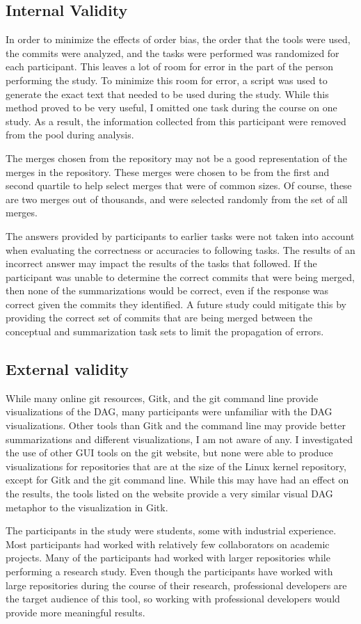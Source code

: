 \subsection{Internal Validity}\label{sub:internal_validity}

In order to minimize the effects of order bias, the order that the tools
were used, the commits were analyzed, and the tasks were performed was
randomized for each participant. This leaves a lot of room for error in
the part of the person performing the study. To minimize this room for
error, a script was used to generate the exact text that needed to be
used during the study. While this method proved to be very useful, I
omitted one task during the course on one study. As a result, the
information collected from this participant were removed from the pool
during analysis.

The merges chosen from the repository may not be a good representation
of the merges in the repository. These merges were chosen to be from the
first and second quartile to help select merges that were of common
sizes. Of course, these are two merges out of thousands, and were
selected randomly from the set of all merges.

The answers provided by participants to earlier tasks were not taken
into account when evaluating the correctness or accuracies to following
tasks. The results of an incorrect answer may impact the results of the
tasks that followed. If the participant was unable to determine the
correct commits that were being merged, then none of the summarizations
would be correct, even if the response was correct given the commits
they identified. A future study could mitigate this by providing the
correct set of commits that are being merged between the conceptual and
summarization task sets to limit the propagation of errors.

\subsection{External validity}\label{sub:external_validity}

While many online git resources, Gitk, and the git command line provide
visualizations of the DAG, many participants were unfamiliar with the
DAG visualizations. Other tools than Gitk and the command line may
provide better summarizations and different visualizations, I am not
aware of any. I investigated the use of other GUI tools on the git
website, but none were able to produce visualizations for repositories
that are at the size of the Linux kernel repository, except for Gitk and
the git command line. While this may have had an effect on the results,
the tools listed on the website provide a very similar visual DAG
metaphor to the visualization in Gitk.

The participants in the study were students, some with industrial
experience. Most participants had worked with relatively few
collaborators on academic projects. Many of the participants had worked
with larger repositories while performing a research study. Even though
the participants have worked with large repositories during the course
of their research, professional developers are the target audience of
this tool, so working with professional developers would provide more
meaningful results.
